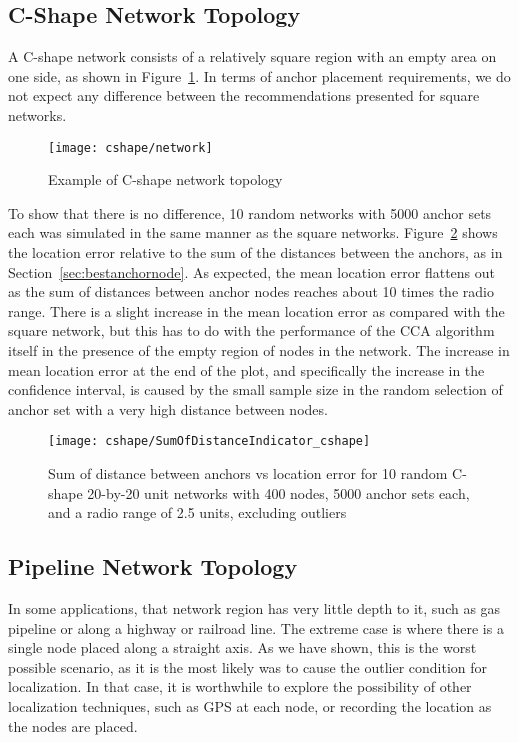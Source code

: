 \subsection{C-Shape Network Topology}

A C-shape network consists of a relatively square region with an empty area on one side, as shown in Figure~\ref{fig:cnetwork}.  In terms of anchor placement requirements, we do not expect any difference between the recommendations presented for square networks.

\begin{figure}
  \centering
	\texttt{[image: cshape/network]}
	\caption{Example of C-shape network topology}
	\label{fig:cnetwork}
\end{figure}

To show that there is no difference, 10 random networks with 5000 anchor sets each was simulated in the same manner as the square networks.  Figure~\ref{fig:cindicator} shows the location error relative to the sum of the distances between the anchors, as in Section~\ref{sec:bestanchornode}. 
As expected, the mean location error flattens out as the sum of distances between anchor nodes reaches about 10 times the radio range.  There is a slight increase in the mean location error as compared with the square network, but this has to do with the performance of the CCA algorithm itself in the presence of the empty region of nodes in the network.  The increase in mean location error at the end of the plot, and specifically the increase in the confidence interval, is caused by the small sample size in the random selection of anchor set with a very high distance between nodes. 

\begin{figure}
  \centering
	\texttt{[image: cshape/SumOfDistanceIndicator\_cshape]}
	\caption[Sum of distance between anchors vs location error in a C-Shape topology]{Sum of distance between anchors vs location error for 10 random C-shape 20-by-20 unit networks with 400 nodes, 5000 anchor sets each, and a radio range of 2.5 units, excluding outliers}
	\label{fig:cindicator}
\end{figure}

\subsection{Pipeline Network Topology}

In some applications, that network region has very little depth to it, such as gas pipeline or along a highway or railroad line.  The extreme case is where there is a single node placed along a straight axis.  As we have shown, this is the worst possible scenario, as it is the most likely was to cause the outlier condition for localization.  In that case, it is worthwhile to explore the possibility of other localization techniques, such as GPS at each node, or recording the location as the nodes are placed.  

